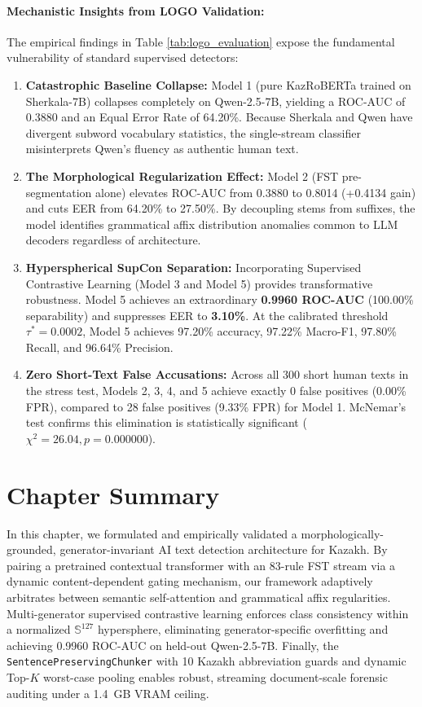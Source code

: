 \paragraph{Mechanistic Insights from LOGO Validation:}
The empirical findings in Table \ref{tab:logo_evaluation} expose the fundamental vulnerability of standard supervised detectors:
\begin{enumerate}
    \item \textbf{Catastrophic Baseline Collapse:} Model 1 (pure KazRoBERTa trained on Sherkala-7B) collapses completely on Qwen-2.5-7B, yielding a ROC-AUC of 0.3880 and an Equal Error Rate of 64.20\%. Because Sherkala and Qwen have divergent subword vocabulary statistics, the single-stream classifier misinterprets Qwen's fluency as authentic human text.
    \item \textbf{The Morphological Regularization Effect:} Model 2 (FST pre-segmentation alone) elevates ROC-AUC from 0.3880 to 0.8014 (+0.4134 gain) and cuts EER from 64.20\% to 27.50\%. By decoupling stems from suffixes, the model identifies grammatical affix distribution anomalies common to LLM decoders regardless of architecture.
    \item \textbf{Hyperspherical SupCon Separation:} Incorporating Supervised Contrastive Learning (Model 3 and Model 5) provides transformative robustness. Model 5 achieves an extraordinary \textbf{0.9960 ROC-AUC} (100.00\% separability) and suppresses EER to \textbf{3.10\%}. At the calibrated threshold $\tau^* = 0.0002$, Model 5 achieves 97.20\% accuracy, 97.22\% Macro-F1, 97.80\% Recall, and 96.64\% Precision.
    \item \textbf{Zero Short-Text False Accusations:} Across all 300 short human texts in the stress test, Models 2, 3, 4, and 5 achieve exactly 0 false positives (0.00\% FPR), compared to 28 false positives (9.33\% FPR) for Model 1. McNemar's test confirms this elimination is statistically significant ($\chi^2 = 26.04, p = 0.000000$).
\end{enumerate}

\section{Chapter Summary}
\label{sec:ch4_summary}

In this chapter, we formulated and empirically validated a morphologically-grounded, generator-invariant AI text detection architecture for Kazakh. By pairing a pretrained contextual transformer with an 83-rule FST stream via a dynamic content-dependent gating mechanism, our framework adaptively arbitrates between semantic self-attention and grammatical affix regularities. Multi-generator supervised contrastive learning enforces class consistency within a normalized $\mathbb{S}^{127}$ hypersphere, eliminating generator-specific overfitting and achieving 0.9960 ROC-AUC on held-out Qwen-2.5-7B. Finally, the \texttt{SentencePreservingChunker} with 10 Kazakh abbreviation guards and dynamic Top-$K$ worst-case pooling enables robust, streaming document-scale forensic auditing under a 1.4~GB VRAM ceiling.

